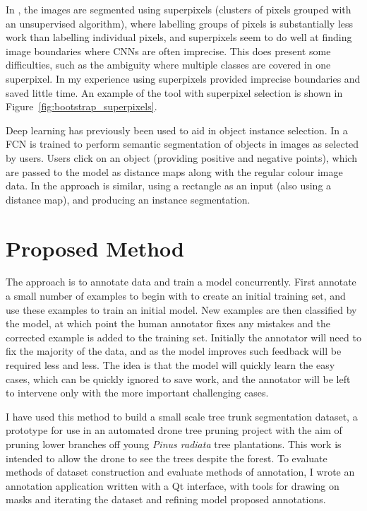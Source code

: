 In \cite{Galloway2017}, the images are segmented using superpixels (clusters of pixels grouped with an unsupervised algorithm), where labelling groups of pixels is substantially less work than labelling individual pixels, and superpixels seem to do well at finding image boundaries where \gls{CNN}s are often imprecise. This does present some difficulties, such as the ambiguity where multiple classes are covered in one superpixel. In my experience using superpixels provided imprecise boundaries and saved little time. An example of the tool with superpixel selection is shown in Figure~\ref{fig:bootstrap_superpixels}.

Deep learning has previously been used to aid in object instance selection. In \cite{Xu2016} a \gls{FCN} is trained to perform semantic segmentation of objects in images as selected by users. Users click on an object (providing positive and negative points), which are passed to the model as distance maps along with the regular colour image data. In \cite{Xu2017} the approach is similar, using a rectangle as an input (also using a distance map), and producing an instance segmentation.


\section{Proposed Method}

The approach is to annotate data and train a model concurrently. First annotate a small number of examples to begin with to create an initial training set, and use these examples to train an initial model. New examples are then classified by the model, at which point the human annotator fixes any mistakes and the corrected example is added to the training set. Initially the annotator will need to fix the majority of the data, and as the model improves such feedback will be required less and less. The idea is that the model will quickly learn the easy cases, which can be quickly ignored to save work, and the annotator will be left to intervene only with the more important challenging cases.

I have used this method to build a small scale tree trunk segmentation dataset, a prototype for use in an automated drone tree pruning project with the aim of pruning lower branches off young \emph{Pinus radiata} tree plantations. This work is intended to allow the drone to see the trees despite the forest. To evaluate methods of dataset construction and evaluate methods of annotation, I wrote an annotation application written with a Qt interface, with tools for drawing on masks and iterating the dataset and refining model proposed annotations.

